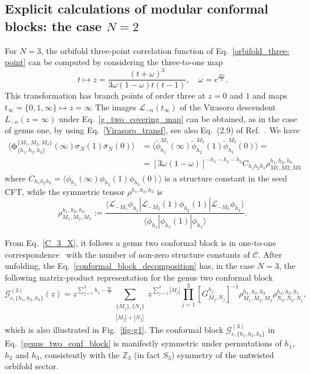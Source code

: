 \documentclass[a4paper,11pt]{article}
\begin{document}
\subsection{Explicit calculations of modular conformal blocks: the case $N=2$}

For $N=3$, the orbifold three-point correlation 
function of Eq.~\eqref{orbifold_three-point} can be computed 
by considering the three-to-one map~\cite{Collier}
\begin{equation}\label{g_two_covering_map}
 t\mapsto z =\frac{(t+\omega)^3}{3\omega(1-\omega)t(t-1)},\quad \omega=e^{\frac{2\pi i}{3}}.
\end{equation}
This transformation has branch points of order three at 
$z=0$ and $1$ and maps $t_{\infty}=\{0, 1, \infty\} \mapsto z=\infty$ 
The images $\mathcal{L}_{-n}(t_{\infty})$ of the Virasoro descendent $L_{-n}(z=\infty)$ 
under Eq.~\eqref{g_two_covering_map} can be obtained, as in the 
case of genus one, by using Eq.~\eqref{Virasoro_transf}, see also Eq.~(2.9)
of Ref.~\cite{Collier}. We have 
\begin{align}\label{C_3_X}
 \langle \boldsymbol{\phi}^{\{M_1,M_2,M_3\}}_{\{h_1,h_2,h_3\}}(\infty) \sigma_{N}(1)\bar{\sigma}_{N}(0)\rangle &=\langle \tilde{\phi}_{h_1}^{M_1} (\infty) \tilde{\phi}_{h_2}^{M_2}(1) \tilde{\phi}_{h_3}^{M_3}(0)\rangle
 = \\
 &=[3\omega(1-\omega)]^{-h_1-h_2-h_3}C_{h_1h_2h_3}\rho_{M1,M2,M3}^{h_1,h_2,h_3}
\end{align}
where $C_{h_1 h_2 h_3}=\langle \phi_{h_1}(\infty)\phi_{h_2}(1)\phi_{h_3}(0)\rangle$ is a structure constant in the seed CFT, while the symmetric tensor $\rho^{h_1,h_2,h_3}$ is 
\begin{equation}
 \rho^{h_1,h_2,h_3}_{M_1,M_2,M_3}:=
 \frac{\langle \mathcal{L}_{-M_1}\phi_{h_1}|\mathcal{L}_{-M_2}(1)\phi_{h_2}(1)|\mathcal{L}_{-M_3}\phi_{h_3}\rangle}
 { \langle \phi_{h_1}|\phi_{h_2}(1)|\phi_{h_3}\rangle}.
\end{equation}

From Eq.~\eqref{C_3_X}, it follows a genus two conformal block is in one-to-one correspondence~\cite{Cardy, Collier} with the number of non-zero structure constants of $\mathcal{C}$.
After unfolding, the Eq.~\eqref{conformal_block_decomposition} has, in the case $N=3$, the  following matrix-product representation
for the genus two conformal block \cite{Collier}
\begin{equation}\label{genus_two_conf_block}
 \mathcal{G}_{c, \{h_1, h_2, h_3\}}^{(3)}(z)=
z^{\sum_{j=1}^3 h_j-\frac{2c}{9}}\sum_{\substack{\{M_j\}, \{N_j\}\\|M_j|+|N_j|}}
 z^{\sum\limits_{j=1}^3 |M_j|}
 \prod_{j=1}^3 [G_{M_j,N_j}^{h_j}]^{-1}
 \rho^{h_1,h_2,h_3}_{M_1,M_2,M_3}\rho_{N_3,N_2,N_1}^{h_3,h_2,h_1},
\end{equation}
which is also illustrated in Fig.~\ref{fig-g1}.
The conformal block $\mathcal{G}_{c, \{h_1, h_2, h_3\}}^{(3)}$ in Eq.~\eqref{genus_two_conf_block} is
manifestly symmetric under permutations of $h_1$, $h_2$ and $h_3$, consistently with the $\mathbb Z_3$ (in fact $S_3$) symmetry of the untwisted orbifold sector.
\end{document}
